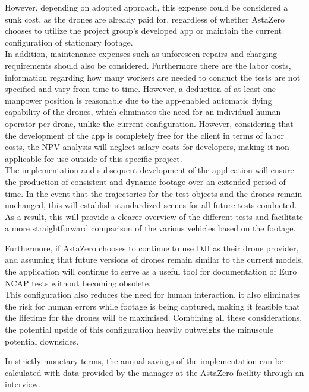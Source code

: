 However, depending on adopted approach, this expense could be considered a sunk cost, as the drones are already paid for, regardless of whether AstaZero chooses to utilize the project group's developed app or maintain the current configuration of stationary footage.
\\

In addition, maintenance expenses such as unforeseen repairs and charging requirements should also be considered.
Furthermore there are the labor costs, information regarding how many workers are needed to conduct the tests are not specified and vary from time to time. However, a deduction of at least one manpower position is reasonable due to the app-enabled automatic flying capability of the drones, which eliminates the need for an individual human operator per drone, unlike the current configuration. However, considering that the development of the app is completely free for the client in terms of labor costs, the NPV-analysis will neglect salary costs for developers, making it non-applicable for use outside of this specific project.  
\\

The implementation and subsequent development of the application will ensure the production of consistent and dynamic footage over an extended period of time. In the event that the trajectories for the test objects and the drones remain unchanged, this will establish standardized scenes for all future tests conducted. As a result, this will provide a clearer overview of the different tests and facilitate a more straightforward comparison of the various vehicles based on the footage.

Furthermore, if AstaZero chooses to continue to use DJI as their drone provider, and assuming that future versions of drones remain similar to the current models, the application will continue to serve as a useful tool for documentation of Euro NCAP tests without becoming obsolete. 
\\

This configuration also reduces the need for human interaction, it also eliminates the risk for human errors while footage is being captured, making it feasible that the lifetime for the drones will be maximised. Combining all these considerations, the potential upside of this configuration heavily outweighs the minuscule potential downsides. 

In strictly monetary terms, the annual savings of the implementation can be calculated with data provided by the manager at the AstaZero facility through an interview. 
\\

